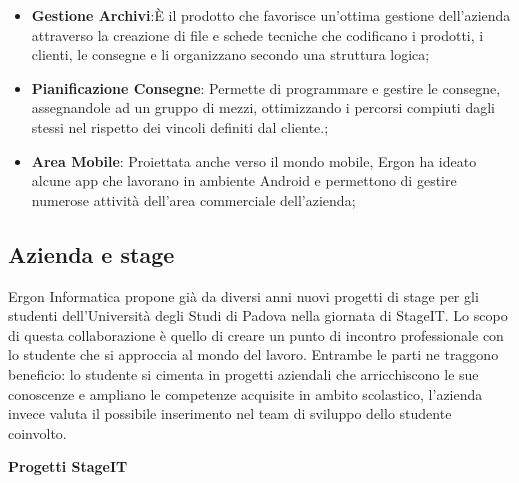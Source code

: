 \begin{itemize}
	\item \textbf{Gestione Archivi}:È il prodotto che favorisce un’ottima gestione dell’azienda attraverso la creazione di file e schede tecniche che codificano i prodotti, i clienti, le consegne e li organizzano secondo una struttura logica;
	
	\item \textbf{Pianificazione Consegne}: Permette di programmare e gestire le consegne, assegnandole ad un gruppo di mezzi, ottimizzando i percorsi compiuti dagli stessi nel rispetto dei vincoli definiti dal cliente.;
	
	\item \textbf{Area Mobile}: Proiettata anche verso il mondo mobile, Ergon ha ideato alcune app che lavorano in ambiente Android e permettono di gestire numerose attività dell'area commerciale dell'azienda;
	
	
\end{itemize}

\subsection{Azienda e stage}

Ergon Informatica propone già da diversi anni nuovi progetti di stage per gli studenti dell'Università degli Studi di Padova nella giornata di StageIT. Lo scopo di questa collaborazione è quello di creare un punto di incontro professionale con lo studente che si approccia al mondo del lavoro. Entrambe le parti ne traggono beneficio: lo studente si cimenta in progetti aziendali che arricchiscono le sue conoscenze e ampliano le competenze acquisite in ambito scolastico, l'azienda invece valuta il possibile inserimento nel team di sviluppo dello studente coinvolto.

\textbf{Progetti StageIT}


